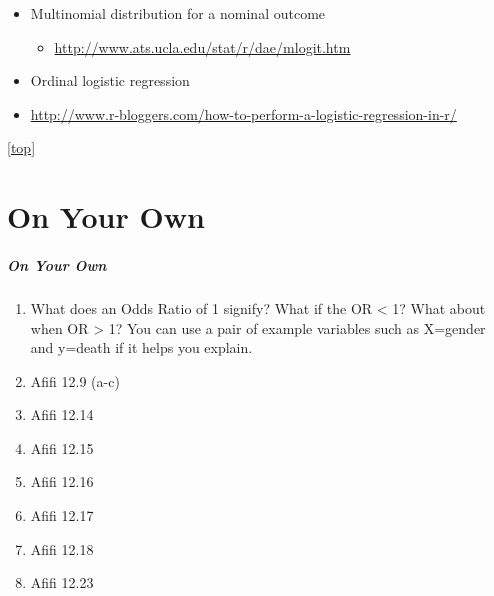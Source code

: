 \documentclass[]{article}
\begin{document}
\begin{itemize}
\item
  Multinomial distribution for a nominal outcome

  \begin{itemize}
  \itemsep1pt\parskip0pt
  \item
    \url{http://www.ats.ucla.edu/stat/r/dae/mlogit.htm}
  \end{itemize}
\item
  Ordinal logistic regression
\item
  \url{http://www.r-bloggers.com/how-to-perform-a-logistic-regression-in-r/}
\end{itemize}

\href{lec08_LogisticRegression.html}{{[}top{]}}

\section{On Your Own}\label{on-your-own}

\subparagraph{On Your Own}\label{on-your-own-1}

\begin{enumerate}
\def\labelenumi{\arabic{enumi}.}
\itemsep1pt\parskip0pt
\item
  What does an Odds Ratio of 1 signify? What if the OR \textless{} 1?
  What about when OR \textgreater{} 1? You can use a pair of example
  variables such as X=gender and y=death if it helps you explain.
\item
  Afifi 12.9 (a-c)
\item
  Afifi 12.14
\item
  Afifi 12.15
\item
  Afifi 12.16
\item
  Afifi 12.17
\item
  Afifi 12.18
\item
  Afifi 12.23
\end{enumerate}
\end{document}
